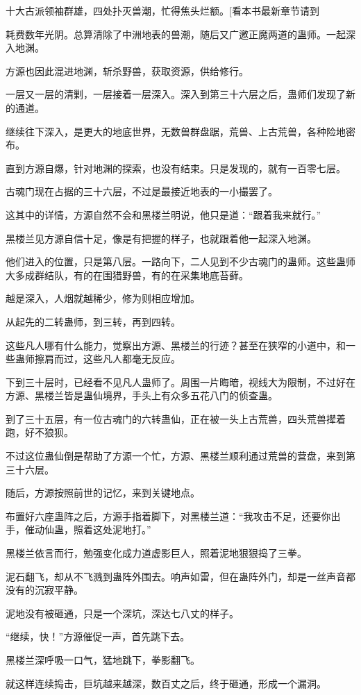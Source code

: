 \begin{this_body}
十大古派领袖群雄，四处扑灭兽潮，忙得焦头烂额。[看本书最新章节请到

耗费数年光阴。总算清除了中洲地表的兽潮，随后又广邀正魔两道的蛊师。一起深入地渊。

方源也因此混进地渊，斩杀野兽，获取资源，供给修行。

一层又一层的清剿，一层接着一层深入。深入到第三十六层之后，蛊师们发现了新的通道。

继续往下深入，是更大的地底世界，无数兽群盘踞，荒兽、上古荒兽，各种险地密布。

直到方源自爆，针对地渊的探索，也没有结束。只是发现的，就有一百零七层。

古魂门现在占据的三十六层，不过是最接近地表的一小撮罢了。

这其中的详情，方源自然不会和黑楼兰明说，他只是道：“跟着我来就行。”

黑楼兰见方源自信十足，像是有把握的样子，也就跟着他一起深入地渊。

他们进入的位置，只是第八层。一路向下，二人见到不少古魂门的蛊师。这些蛊师大多成群结队，有的在围猎野兽，有的在采集地底苔藓。

越是深入，人烟就越稀少，修为则相应增加。

从起先的二转蛊师，到三转，再到四转。

这些凡人哪有什么能力，觉察出方源、黑楼兰的行迹？甚至在狭窄的小道中，和一些蛊师擦肩而过，这些凡人都毫无反应。

下到三十层时，已经看不见凡人蛊师了。周围一片晦暗，视线大为限制，不过好在方源、黑楼兰皆是蛊仙境界，手头上有众多五花八门的侦查蛊。

到了三十五层，有一位古魂门的六转蛊仙，正在被一头上古荒兽，四头荒兽撵着跑，好不狼狈。

不过这位蛊仙倒是帮助了方源一个忙，方源、黑楼兰顺利通过荒兽的营盘，来到第三十六层。

随后，方源按照前世的记忆，来到关键地点。

布置好六座蛊阵之后，方源手指着脚下，对黑楼兰道：“我攻击不足，还要你出手，催动仙蛊，照着这处泥地打。”

黑楼兰依言而行，勉强变化成力道虚影巨人，照着泥地狠狠捣了三拳。

泥石翻飞，却从不飞溅到蛊阵外围去。响声如雷，但在蛊阵外门，却是一丝声音都没有的沉寂平静。

泥地没有被砸通，只是一个深坑，深达七八丈的样子。

“继续，快！”方源催促一声，首先跳下去。

黑楼兰深呼吸一口气，猛地跳下，拳影翻飞。

就这样连续捣击，巨坑越来越深，数百丈之后，终于砸通，形成一个漏洞。


\end{this_body}
